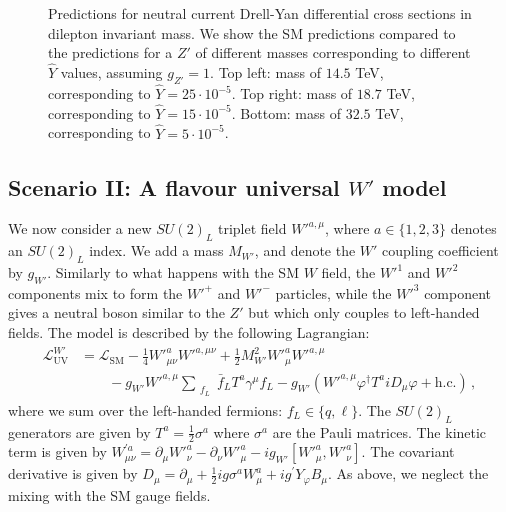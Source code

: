 \documentclass[withindex,glossary]{cam-thesis}
\begin{document}
\begin{figure}[htb]
	\caption{Predictions for neutral current Drell-Yan differential cross sections in dilepton invariant mass.  
    We show the SM predictions compared to the predictions for a $Z'$ of different masses corresponding to different $\hat{Y}$ values, assuming $g_{Z'}=1$. 
    Top left: mass of $14.5$ TeV, corresponding to $\hat{Y}=25 \cdot 10^{-5}$. Top right: mass of $18.7$ TeV, corresponding to $\hat{Y}=15 \cdot 10^{-5}$. 
    Bottom: mass of $32.5$ TeV, corresponding to $\hat{Y}=5 \cdot 10^{-5}$.}
	\label{fig:Zp_DY_Comp}
\end{figure}


\subsection{Scenario II: A flavour universal $W'$ model}
\label{subsec:model-wprime}

We now consider a new $SU(2)_L$ triplet field ${W'}^{a, \mu}$, where $a \in \{1,2,3\}$ denotes an $SU(2)_L$ index. We add a mass $M_{W'}$, and denote the $W'$ coupling coefficient by $g_{W'}$. Similarly to what happens with the SM $W$ field, the $W'^1$ and $W'^2$ components mix to form the $W'^+$ and $W'^-$ particles, while the $W'^3$ component gives a neutral boson similar to the $Z'$ but which only couples to left-handed fields. The 
model is described by the following Lagrangian:
\begin{equation} \label{eq:Wprime}
	\begin{split}
		\mathcal{L}^{W'}_{\text{UV}} &= \mathcal{L}_{\text{SM}} - \frac{1}{4} {W'}^{a}_{\mu \nu} {W'}^{a, \mu \nu} + \frac{1}{2} M_{W'}^{2} {W'}_{\mu}^{a} {W'}^{a, \mu}\\
		&\qquad - g_{W'} {W'}^{a,\mu} \sum_{\substack{f_L}} \bar{f}_L T^{a} \gamma^{\mu} f_L
		 - g_{W'} ({W'}^{a, \mu} \varphi^{\dagger} T^{a} i D_{\mu} \varphi + \textrm{h.c.}) \, ,
	\end{split}
\end{equation}
%
where we sum over the left-handed fermions: $f_L \in \{q, \ell\}$. The $SU(2)_L$ generators are given by $T^a = \frac{1}{2} \sigma ^a$ where $\sigma ^a$ are the Pauli matrices. The kinetic term is given by $W^{'a}_{\mu \nu} = \partial_{\mu} {W'}^{a}_{\nu} - \partial_{\nu} {W'}^{a}_{\mu}- ig_{W'} [{W'}^{a}_{\mu}, {W'}^{a}_{\nu} ]$. The covariant derivative is given by
$D_{\mu} = \partial_{\mu} + \frac{1}{2} ig \sigma^{a} W_{\mu}^{a} + i g^{'} Y_{\varphi} B_{\mu}$.
As above, we neglect the mixing with the SM gauge fields.  
\end{document}
